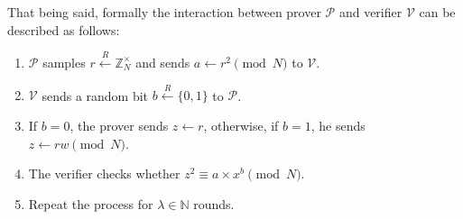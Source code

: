 \documentclass[../lecture-notes.tex]{subfiles}
\begin{document}
That being said, formally the interaction between prover $\mathcal{P}$ and verifier $\mathcal{V}$ can be described as follows:
\begin{enumerate}
    \item $\mathcal{P}$ samples $r \xleftarrow{R} \mathbb{Z}_N^{\times}$ and sends $a \gets r^2 \pmod{N}$ to $\mathcal{V}$.
    \item $\mathcal{V}$ sends a random bit $b \xleftarrow{R} \{0,1\}$ to $\mathcal{P}$.
    \item If $b=0$, the prover sends $z \gets r$, otherwise, if $b=1$, he sends $z \gets rw \pmod{N}$.
    \item The verifier checks whether $z^2 \equiv a\times x^{b} \pmod{N}$.
    \item Repeat the process for $\lambda \in \mathbb{N}$ rounds.
\end{enumerate}
\end{document}
